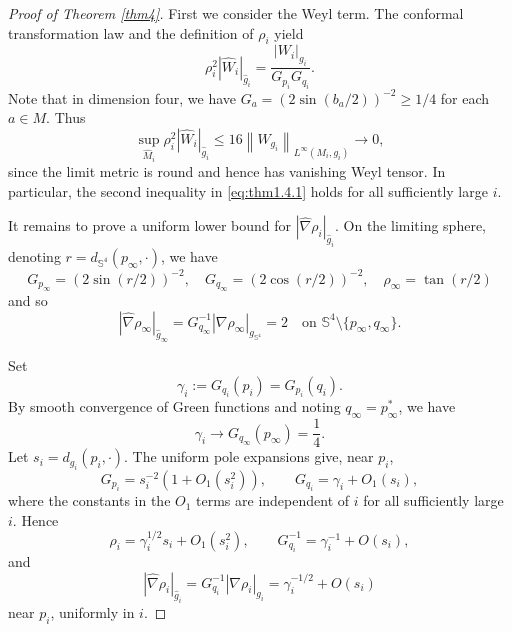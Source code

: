 \documentclass[11pt]{amsart}
\theoremstyle{plain}
\numberwithin{equation}{section}
\renewcommand{\S}{\mathbb{S}}
\newcommand{\wh}[1]{\widehat{#1}}
\newcommand{\norm}[1]{\left\|#1\right\|}
\newcommand{\hn}{\widehat{\nabla}}
\newcommand{\hg}{\widehat{g}}
\newcommand{\hw}{\widehat{W}}
\newcommand{\hm}{\widehat{M}}
\begin{document}
\begin{proof}[Proof of Theorem \ref{thm4}]
First we consider the Weyl term. The conformal transformation law and the definition of $\rho_i$ yield
\begin{equation*}
\rho_i^2|\wh{W}_i|_{\wh{g}_i}=\frac{|W_i|_{g_i}}{G_{p_i}G_{q_i}}.
\end{equation*}
Note that in dimension four, we have $G_a=(2\sin(b_a/2))^{-2}\ge1/4$ for each $a\in M$. Thus
\begin{equation}
\sup_{\hm_i}\rho_i^2|\hw_i|_{\hg_i}\le16\norm{W_{g_i}}_{L^\infty(M_i,g_i)}\rightarrow0,
\end{equation}
since the limit metric is round and hence has vanishing Weyl tensor. In particular, the second inequality in \eqref{eq:thm1.4.1} holds for all sufficiently large $i$.

It remains to prove a uniform lower bound for $|\hn\rho_i|_{\hg_i}$. On the limiting sphere, denoting $r=d_{\S^4}(p_\infty,\cdot)$, we have
\begin{equation*}
G_{p_\infty}=(2\sin(r/2))^{-2},\quad G_{q_\infty}=(2\cos(r/2))^{-2},\quad \rho_\infty=\tan(r/2)
\end{equation*}
and so
\begin{equation}\label{eq:thm1.4.2}
|\hn\rho_\infty|_{\hg_\infty}=G_{q_\infty}^{-1}|\nabla\rho_\infty|_{g_{\S^4}}=2 \quad\text{on $\S^4\setminus\{p_\infty,q_\infty\}$}.
\end{equation}

Set 
\begin{equation*}
    \gamma_i:=G_{q_i}(p_i)=G_{p_i}(q_i).
\end{equation*}
By smooth convergence of Green functions and noting $q_\infty=p_\infty^\ast$, we have
\begin{equation}\label{eq:thm1.4.3}
\gamma_i\rightarrow G_{q_\infty}(p_\infty)=\frac{1}{4}.
\end{equation}
Let $s_i=d_{g_i}(p_i,\cdot)$. The uniform pole expansions give, near $p_i$,
\begin{equation*}
G_{p_i}=s_i^{-2}(1+O_1(s_i^2)),\qquad G_{q_i}=\gamma_i+O_1(s_i),
\end{equation*}
where the constants in the $O_1$ terms are independent of $i$ for all sufficiently large $i$. Hence
\begin{equation*}
\rho_i=\gamma_i^{1/2}s_i+O_1(s_i^2),\qquad G_{q_i}^{-1}=\gamma_i^{-1}+O(s_i),
\end{equation*}
and 
\begin{equation}\label{eq:thm1.4.4}
|\hn\rho_i|_{\hg_i}=G_{q_i}^{-1}|\nabla\rho_i|_{g_i}=\gamma_i^{-1/2}+O(s_i)
\end{equation}
near $p_i$, uniformly in $i$.


\end{proof}
\end{document}
